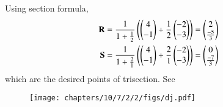 Using section formula,
\begin{align}
\mathbf{R}=\frac{1}{1+\frac{1}{2}}\left(\begin{pmatrix}4\\-1\end{pmatrix}+\frac{1}{2}\begin{pmatrix}-2\\-3\end{pmatrix}\right)
=\begin{pmatrix}2\\ \frac{-5}{3}\end{pmatrix}\\
\mathbf{S}=\frac{1}{1+\frac{2}{1}}\left(\begin{pmatrix}4\\-1\end{pmatrix}+\frac{2}{1}\begin{pmatrix}-2\\-3\end{pmatrix}\right)
=\begin{pmatrix}0\\ \frac{-7}{3}\end{pmatrix}
\end{align}
which are the desired points of trisection.  See
\begin{figure}[H]
\centering
\texttt{[image: chapters/10/7/2/2/figs/dj.pdf]}
\caption{}
		\label{fig:chapters/10/7/2/2/Figure}
\end{figure}

